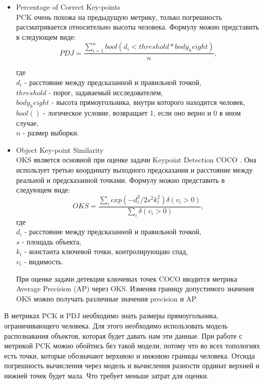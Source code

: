 \begin{itemize}
	\item Percentage of Correct Key-points\\
	PCK очень похожа на предыдущую метрику, только погрешность рассматривается относительно высоты человека. Формулу можно представить в следующем виде:
	\begin{equation}
		PDJ = \frac{\sum_{i=1}^{n} bool(d_i < threshold * body_height)}{n},
	\end{equation}
	
	где\\
	$d_i$ - расстояние между предсказанной и правильной точкой,\\
	$threshold$ - порог, задаваемый исследователем,\\
	$body_height$ - высота прямоугольника, внутри которого находится человек,\\
	$bool()$ - логическое условие, возвращает 1, если оно верно и 0 в ином случае,\\
	$n$ - размер выборки.
	
	\item Object Key-point Similarity\\
	OKS является основной при оценке задачи Keypoint Detection COCO \cite{COCO_topology}. Она использует третью координату выходного предсказания и расстояние между реальной и предсказанной точками. Формулу можно представить в следующем виде:
	\begin{equation}
		OKS = \frac{\sum_{i} exp\left( - d_i^2 / 2s^2k_i^2\right)\delta\left(v_i > 0\right)}{\sum_{i} \delta\left(v_i > 0\right)},
	\end{equation}
	где\\
	$d_i$ - расстояние между предсказанной и правильной точкой,\\
	$s$ - площадь объекта,\\
	$k_i$ - константа ключевой точки, контролирующаю спад,\\
	$v_i$ - видимость.
	
	При оценке задачи детекции ключевых точек COCO вводится метрика Average Precision (AP) через OKS. Изменяя границу допустимого значения OKS можно получать различные значения precision и AP.
\end{itemize}

В метриках PCK и PDJ необходимо знать размеры прямоугольника, ограничивающего человека. Для этого необходимо использовать модель распознавания объектов, которая будет давать нам эти данные. При работе с метрикой PCK можно обойтись без такой модели, потому что во всех топологиях есть точки, которые обозначают верхнюю и нижнюю границы человека. Отсюда погрешность вычисления через модель и вычисления разности ординат верхней и нижней точек будет мала. Что требует меньше затрат для оценки.

